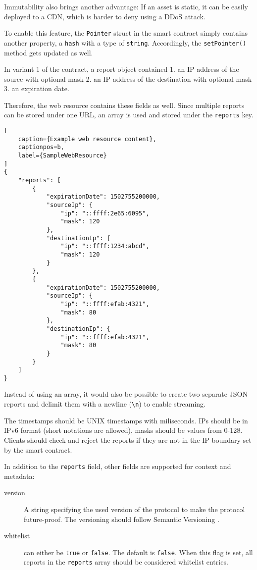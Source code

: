 Immutability also brings another advantage: If an asset is static, it can be easily deployed to a CDN, which is harder to deny using a DDoS attack.

To enable this feature, the \texttt{Pointer} struct in the smart contract simply contains another property, a \texttt{hash} with a type of \texttt{string}. Accordingly, the \texttt{setPointer()} method gets updated as well.

In variant 1 of the contract, a report object contained 1. an IP address of the source with optional mask 2. an IP address of the destination with optional mask 3. an expiration date.

Therefore, the web resource contains these fields as well. Since multiple reports can be stored under one URL, an array is used and stored under the \texttt{reports} key.

\begin{lstlisting}[
    caption={Example web resource content},
    captionpos=b,
    label={SampleWebResource}
]
{
    "reports": [
        {
            "expirationDate": 1502755200000,
            "sourceIp": {
                "ip": "::ffff:2e65:6095",
                "mask": 120
            },
            "destinationIp": {
                "ip": "::ffff:1234:abcd",
                "mask": 120
            }
        },
        {
            "expirationDate": 1502755200000,
            "sourceIp": {
                "ip": "::ffff:efab:4321",
                "mask": 80
            },
            "destinationIp": {
                "ip": "::ffff:efab:4321",
                "mask": 80
            }
        }
    ]
}
\end{lstlisting}

Instead of using an array, it would also be possible to create two separate JSON reports and delimit them with a newline (\texttt{{\textbackslash}n}) to enable streaming.

The timestamps should be UNIX timestamps with miliseconds. IPs should be in IPv6 format (short notations are allowed), masks should be values from 0-128. Clients should check and reject the reports if they are not in the IP boundary set by the smart contract.

In addition to the \texttt{reports} field, other fields are supported for context and metadata:

\begin{description}

\item [version] A string specifying the used version of the protocol to make the protocol future-proof. The versioning should follow Semantic Versioning \cite{Semver}.

\item [whitelist] can either be \texttt{true} or \texttt{false}. The default is \texttt{false}. When this flag is set, all reports in the \texttt{reports} array should be considered whitelist entries.

\end{description}

